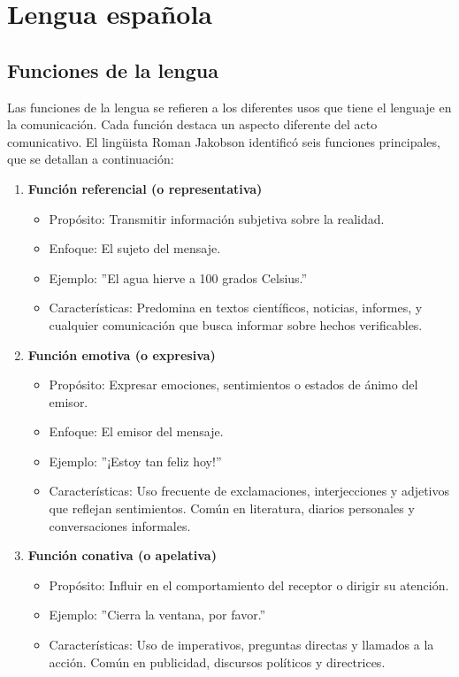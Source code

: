 \section{Lengua española}
\subsection{Funciones de la lengua}

Las funciones de la lengua se refieren a los diferentes usos que tiene el lenguaje en la comunicación. Cada función destaca un aspecto diferente del acto comunicativo. El lingüista Roman Jakobson identificó seis funciones principales, que se detallan a continuación:

\begin{enumerate}
      \item \textbf{Función referencial (o representativa)}
            \begin{itemize}
                  \item Propósito: Transmitir información subjetiva sobre la realidad.
                  \item Enfoque: El sujeto del mensaje.
                  \item Ejemplo: ''El agua hierve a 100 grados Celsius.''
                  \item Características: Predomina en textos científicos, noticias, informes, y cualquier comunicación que busca informar sobre hechos verificables.
            \end{itemize}

      \item \textbf{Función emotiva (o expresiva)}
            \begin{itemize}
                  \item Propósito: Expresar emociones, sentimientos o estados de ánimo del emisor.
                  \item Enfoque: El emisor del mensaje.
                  \item Ejemplo: ''¡Estoy tan feliz hoy!''
                  \item Características: Uso frecuente de exclamaciones, interjecciones y adjetivos que reflejan sentimientos. Común en literatura, diarios personales y conversaciones informales.
            \end{itemize}

      \item \textbf{Función conativa (o apelativa)}
            \begin{itemize}
                  \item Propósito: Influir en el comportamiento del receptor o dirigir su atención.
                  \item Ejemplo: ''Cierra la ventana, por favor.''
                  \item Características: Uso de imperativos, preguntas directas y llamados a la acción. Común en publicidad, discursos políticos y directrices.
            \end{itemize}


\end{enumerate}
